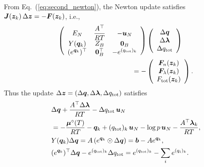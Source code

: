 From Eq.~(\ref{eq:second_newton}), the Newton update satisfies $\boldsymbol{J} (\boldsymbol{z}_k) \, \Delta \boldsymbol{z} = - \boldsymbol{F} (\boldsymbol{z}_k)$, i.e.,
\begin{align}
    \left(
\begin{array}{ccc}
 E_N &  \dfrac{A^\top}{RT} & - \boldsymbol{u}_N\\ 
 Y({\boldsymbol{q}}_k) & Z_B & \boldsymbol{0}_B \\ 
 (e^{{\boldsymbol{q}}_k})^\top & \boldsymbol{0}_B^\top & - e^{(q_\mathrm{tot})_k}\\  
\end{array}
\right)
    &\left(
\begin{array}{c}
\Delta \boldsymbol{q} \\
\Delta \boldsymbol{\lambda} \\
\Delta q_\mathrm{tot}
\end{array}
\right) \nonumber \\
= -
    &\left(
\begin{array}{c}
\boldsymbol{F}_n (\boldsymbol{z}_k) \\
\boldsymbol{F}_\lambda(\boldsymbol{z}_k) \\
F_\mathrm{tot} (\boldsymbol{z}_k)
\end{array}
\right).
\end{align}
Thus the update $\Delta \boldsymbol{z} = (\Delta \boldsymbol{q}, \Delta \boldsymbol{\lambda}, \Delta q_\mathrm{tot})$ satisfies
\begin{align}
\label{eq:update_tce_1_}
    &\Delta \boldsymbol{q} + \frac{A^\top \Delta \boldsymbol{\lambda}}{RT} - \Delta q_\mathrm{tot} \, \boldsymbol{u}_N \nonumber \\
    &= -\frac{\boldsymbol{\mu}^\circ(T)}{RT} - {\boldsymbol{q}}_k + (q_\mathrm{tot})_k \, \boldsymbol{u}_N - \log{p} \, \boldsymbol{u}_N  - \frac{A^\top \boldsymbol{\lambda}_k}{RT}, \\
\label{eq:update_tce_2_}
    &Y(\boldsymbol{q}_k) \Delta \boldsymbol{q} = A \left(e^{\boldsymbol{q}_k} \odot \Delta \boldsymbol{q}\right) = \boldsymbol{b} - A e^{\boldsymbol{q}_k}, \\
\label{eq:update_tce_3_}
    &(e^{\boldsymbol{q}_k})^\top \Delta \boldsymbol{q}  - e^{(q_\mathrm{tot})_k} \Delta q_\mathrm{tot} = e^{(q_\mathrm{tot})_k} - \sum_i {e^{(q_i)_k}} .
\end{align}

